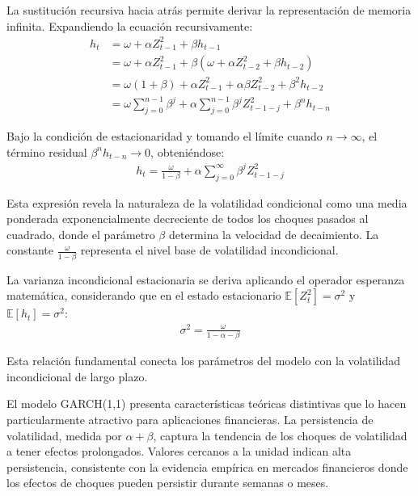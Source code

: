 La sustitución recursiva hacia atrás permite derivar la representación de memoria infinita. Expandiendo la ecuación recursivamente:
\begin{align}
    h_t &= \omega + \alpha Z_{t-1}^2 + \beta h_{t-1}\\
    &= \omega + \alpha Z_{t-1}^2 + \beta(\omega + \alpha Z_{t-2}^2 + \beta h_{t-2})\\
    &= \omega(1 + \beta) + \alpha Z_{t-1}^2 + \alpha\beta Z_{t-2}^2 + \beta^2 h_{t-2}\\
    &= \omega \sum_{j=0}^{n-1} \beta^j + \alpha \sum_{j=0}^{n-1} \beta^j Z_{t-1-j}^2 + \beta^n h_{t-n}
\end{align}

Bajo la condición de estacionaridad y tomando el límite cuando $n \to \infty$, el término residual $\beta^n h_{t-n} \to 0$, obteniéndose:
\begin{align}
    h_t = \frac{\omega}{1-\beta} + \alpha \sum_{j=0}^{\infty} \beta^j Z_{t-1-j}^2
\end{align}

Esta expresión revela la naturaleza de la volatilidad condicional como una media ponderada exponencialmente decreciente de todos los choques pasados al cuadrado, donde el parámetro $\beta$ determina la velocidad de decaimiento. La constante $\frac{\omega}{1-\beta}$ representa el nivel base de volatilidad incondicional.

La varianza incondicional estacionaria se deriva aplicando el operador esperanza matemática, considerando que en el estado estacionario $\mathbb{E}[Z_t^2] = \sigma^2$ y $\mathbb{E}[h_t] = \sigma^2$:
\begin{align}
    \sigma^2 = \frac{\omega}{1 - \alpha - \beta}
\end{align}

Esta relación fundamental conecta los parámetros del modelo con la volatilidad incondicional de largo plazo.
\newline

El modelo GARCH(1,1) presenta características teóricas distintivas que lo hacen particularmente atractivo para aplicaciones financieras. La persistencia de volatilidad, medida por $\alpha + \beta$, captura la tendencia de los choques de volatilidad a tener efectos prolongados. Valores cercanos a la unidad indican alta persistencia, consistente con la evidencia empírica en mercados financieros donde los efectos de choques pueden persistir durante semanas o meses.
\newline

